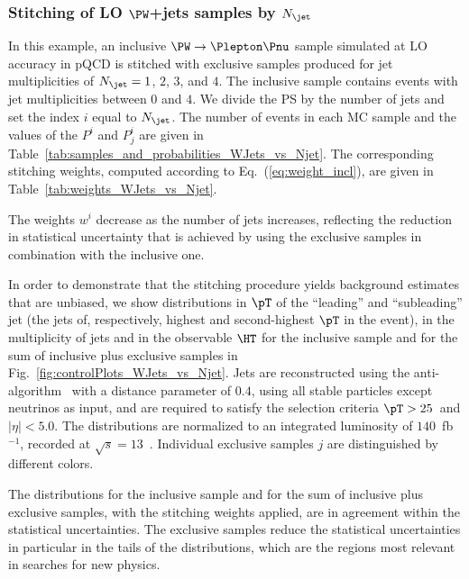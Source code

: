 \subsubsection{Stitching of LO \texorpdfstring{$\PW$}{W}+jets samples by \texorpdfstring{$N_{\jet}$}{Njet}}
\label{sec:WJets_vs_Njet}

In this example, an inclusive $\PW \to \Plepton\Pnu$ sample simulated at LO accuracy in pQCD 
is stitched with exclusive samples produced for jet multiplicities of $N_{\jet} = 1$, $2$, $3$, and $4$.
The inclusive sample contains events with jet multiplicities between $0$ and $4$.
We divide the PS by the number of jets and set the index $i$ equal to $N_{\jet}$.
The number of events in each MC sample and the values of the $P^{i}$ and $P_{j}^{i}$ are given in Table~\ref{tab:samples_and_probabilities_WJets_vs_Njet}.
The corresponding stitching weights, computed according to Eq.~(\ref{eq:weight_incl}), are given in Table~\ref{tab:weights_WJets_vs_Njet}.

The weights $w^{i}$ decrease as the number of jets increases, 
reflecting the reduction in statistical uncertainty that is achieved by using the exclusive samples in combination with the inclusive one.

In order to demonstrate that the stitching procedure yields background estimates that are unbiased,
we show distributions in $\pT$ of the ``leading'' and ``subleading'' jet (the jets of, respectively, highest and second-highest $\pT$ in the event),
in the multiplicity of jets and in the observable $\HT$ 
for the inclusive sample and for the sum of inclusive plus exclusive samples in Fig.~\ref{fig:controlPlots_WJets_vs_Njet}.
Jets are reconstructed using the anti-\kt algorithm~\cite{Cacciari:2008gp,Cacciari:2011ma} with a distance parameter of $0.4$,
using all stable particles except neutrinos as input, and are required to satisfy the selection criteria $\pT > 25$~\GeV and $\vert\eta\vert < 5.0$.
The distributions are normalized to an integrated luminosity of $140$~fb$^{-1}$, recorded at $\sqrt{s}=13$~\TeV.
Individual exclusive samples $j$ are distinguished by different colors.

The distributions for the inclusive sample and for the sum of inclusive plus exclusive samples, with the stitching weights applied, are in agreement within the statistical uncertainties.
The exclusive samples reduce the statistical uncertainties in particular in the tails of the distributions,
which are the regions most relevant in searches for new physics.

